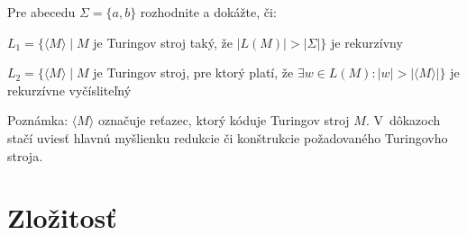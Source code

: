 \documentclass[11pt,a4paper]{article}
\begin{document}
\begin{enumerate}
		Pre abecedu $\Sigma = \{a, b\}$ rozhodnite a dokážte, či:

		$L_1 = \{\langle M \rangle \mid M$ je Turingov stroj taký, že $\vert L(M) \vert  > \vert \Sigma \vert\}$ je rekurzívny

		$L_2 = \{\langle M \rangle \mid M$ je Turingov stroj, pre ktorý platí, že $\exists w \in L(M) : \vert w \vert > \vert \langle M \rangle \vert\}$ je rekurzívne vyčísliteľný

		Poznámka: $\langle M \rangle$ označuje reťazec, ktorý kóduje Turingov stroj $M$. V~dôkazoch stačí uviesť hlavnú myšlienku redukcie či konštrukcie požadovaného Turingovho stroja.
	\end{enumerate}

	\section{Zložitosť}
\end{document}
